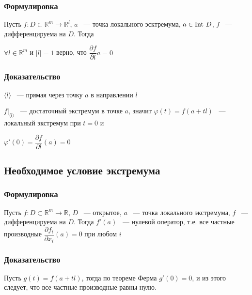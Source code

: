 \documentclass{article}
\begin{document}
            \subsubsection{Формулировка}
            
                Пусть $f : D \subset \mathbb{R}^m \rightarrow \mathbb{R}^l$, $a$ ~--- точка локального эсктремума, $a \in \Int D$, $f$ ~--- дифференцируема на $D$. Тогда
                
                $\forall l \in \mathbb{R}^m$ и $| l | = 1$ верно, что $\dfrac{\partial f}{\partial l}{a} = 0$
                
            \subsubsection{Доказательство}
            
                $\langle l \rangle$ ~--- прямая через точку $a$ в направлении $l$
                
                $f \bigg|_{\langle l \rangle}$ ~--- достаточный экстремум в точке $a$, значит $\varphi(t) = f(a + tl)$ ~--- локальный экстремум при $t = 0$ и
                
                $\varphi'(0) = \dfrac{\partial f}{\partial l} (a) = 0$
                
        \subsection{Необходимое условие экстремума}
        
            \subsubsection{Формулировка}
            
                Пусть $f : D \subset \mathbb{R}^m \rightarrow \mathbb{R}$, $D$ ~--- открытое, $a$ ~--- точка локального экстремума, $f$ ~--- дифференцируема на $D$. Тогда $f'(a)$ ~--- нулевой оператор, т.е. все частные производные $\dfrac{\partial f_i}{\partial x_i} (a) = 0$ при любом $i$
                
            \subsubsection{Доказательство}
            
                Пусть $g(t) = f(a + tl)$, тогда по теореме Ферма $g'(0) = 0$, и из этого следует, что все частные производные равны нулю.
                
\end{document}
